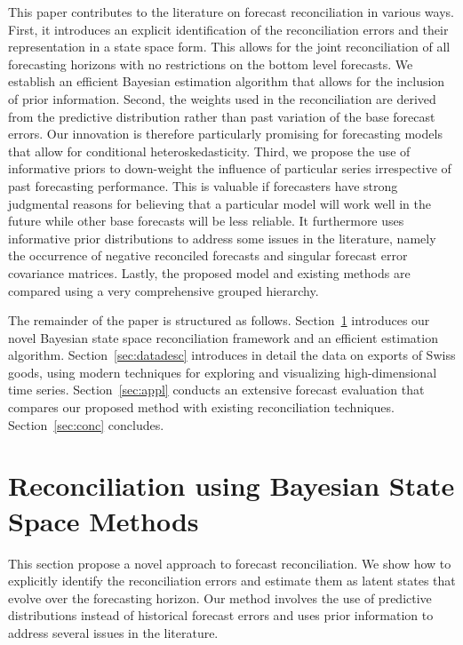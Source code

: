 \documentclass[a4paper,fleqn,11pt]{article}
\begin{document}
This paper contributes to the literature on forecast reconciliation in various ways. First, it introduces an explicit identification of the reconciliation errors and their representation in a state space form. This allows for the joint reconciliation of all forecasting horizons with no restrictions on the bottom level forecasts. We establish an efficient Bayesian estimation algorithm that allows for the inclusion of prior information. Second, the weights used in the reconciliation are derived from the predictive distribution rather than past variation of the base forecast errors. Our innovation is therefore particularly promising for forecasting models that allow for conditional heteroskedasticity. Third, we propose the use of informative priors to down-weight the influence of particular series irrespective of past forecasting performance. This is valuable if forecasters have strong judgmental reasons for believing that a particular model will work well in the future while other base forecasts will be less reliable. It furthermore uses informative prior distributions to address some issues in the literature, namely the occurrence of negative reconciled forecasts and singular forecast error covariance matrices. Lastly, the proposed model and existing methods are compared using a very comprehensive grouped hierarchy.

The remainder of the paper is structured as follows. Section~\ref{sec:model} introduces our novel Bayesian state space reconciliation framework and an efficient estimation algorithm.  Section~\ref{sec:datadesc} introduces in detail the data on exports of Swiss goods, using modern techniques for exploring and visualizing high-dimensional time series.  Section~\ref{sec:appl} conducts an extensive forecast evaluation that compares our proposed method with existing reconciliation techniques. Section~\ref{sec:conc} concludes.






\section{Reconciliation using Bayesian State Space Methods}\label{sec:model}

This section propose a novel approach to forecast reconciliation. We show how to explicitly identify the reconciliation errors and estimate them as latent states that evolve over the forecasting horizon. Our method involves the use of predictive distributions instead of historical forecast errors and uses prior information to address several issues in the literature. 
\end{document}
